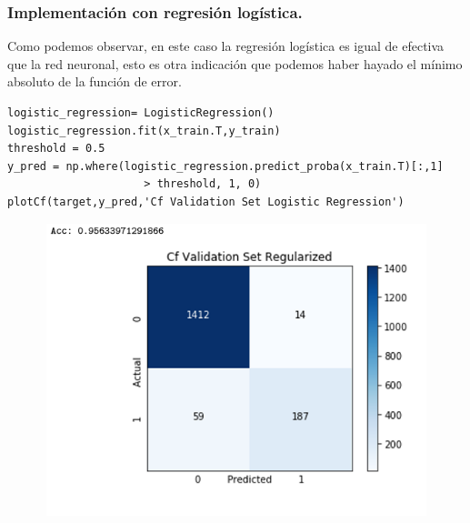 \documentclass[a4paper,10pt]{article}
\begin{document}
\subsubsection{Implementación con regresión logística.}
Como podemos observar, en este caso la regresión logística es igual de efectiva que la red neuronal, esto es otra indicación que podemos haber hayado el mínimo absoluto de la función de error.
\begin{lstlisting}
logistic_regression= LogisticRegression()
logistic_regression.fit(x_train.T,y_train)
threshold = 0.5
y_pred = np.where(logistic_regression.predict_proba(x_train.T)[:,1]
					 > threshold, 1, 0)
plotCf(target,y_pred,'Cf Validation Set Logistic Regression')
\end{lstlisting}
\begin{figure}[H]
\centering
\includegraphics[width=12.0cm, height=8.5cm]{Annotation 2020-03-23 161410}
\end{figure}
\newpage
\end{document}
